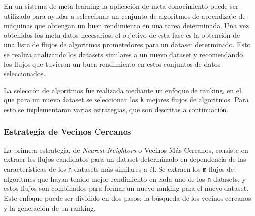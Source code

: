 En un sistema de meta-learning la aplicación de meta-conocimiento puede ser utilizado para ayudar a seleccionar un conjunto de algoritmos de aprendizaje de máquinas que obtengan un buen rendimiento en una tarea determinada. Una vez obtenidos los meta-datos necesarios, el objetivo de esta fase es la obtención de una lista de flujos de algoritmos prometedores para un dataset determinado. Esto se realiza analizando los datasets similares a un nuevo dataset y recomendando los flujos que tuvieron un buen rendimiento en estos conjuntos de datos seleccionados. 

La selección de algoritmos fue realizada mediante un enfoque de ranking, en el que para un nuevo dataset se seleccionan los \texttt{k} mejores flujos de algoritmos. Para esto se implementaron varias estrategias, que son descritas a continuación.


\subsubsection{Estrategia de Vecinos Cercanos}\label{subsub:nn}


La primera estrategia, de \textit{Nearest Neighbors} o Vecinos Más Cercanos, consiste en extraer los flujos candidatos para un dataset determinado en dependencia de las características de los \texttt{n} datasets más similares a él. Se extraen los \texttt{m} flujos de algoritmos que hayan tenido mejor rendimiento en cada uno de los \texttt{n} datasets, y estos flujos son combinados para formar un nuevo ranking para el nuevo dataset. Este enfoque puede ser dividido en dos pasos: la búsqueda de los vecinos cercanos y la generación de un ranking.

